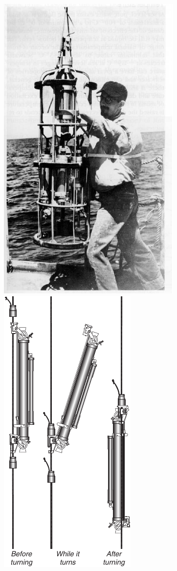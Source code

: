 \begin{figure}[t!]
\includegraphics{pics/ctdnansen}
\ \ \ \ \ \
\includegraphics{pics/ctdnansenRight}

\end{figure}
